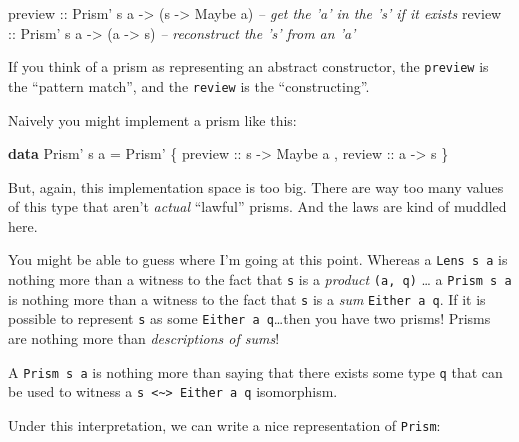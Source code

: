 \documentclass[]{article}
\newenvironment{Shaded}{}{}
\newcommand{\CommentTok}[1]{\textcolor[rgb]{0.38,0.63,0.69}{\textit{#1}}}
\newcommand{\DataTypeTok}[1]{\textcolor[rgb]{0.56,0.13,0.00}{#1}}
\newcommand{\FunctionTok}[1]{\textcolor[rgb]{0.02,0.16,0.49}{#1}}
\newcommand{\KeywordTok}[1]{\textcolor[rgb]{0.00,0.44,0.13}{\textbf{#1}}}
\newcommand{\NormalTok}[1]{#1}
\newcommand{\OtherTok}[1]{\textcolor[rgb]{0.00,0.44,0.13}{#1}}
\begin{document}
\begin{Shaded}
\begin{Highlighting}[]
\OtherTok{preview ::} \DataTypeTok{Prism'}\NormalTok{ s a }\OtherTok{->}\NormalTok{ (s }\OtherTok{->} \DataTypeTok{Maybe}\NormalTok{ a)   }\CommentTok{-- get the 'a' in the 's' if it exists}
\OtherTok{review  ::} \DataTypeTok{Prism'}\NormalTok{ s a }\OtherTok{->}\NormalTok{ (a }\OtherTok{->}\NormalTok{ s)         }\CommentTok{-- reconstruct the 's' from an 'a'}
\end{Highlighting}
\end{Shaded}

If you think of a prism as representing an abstract constructor, the
\texttt{preview} is the ``pattern match'', and the \texttt{review} is the
``constructing''.

Naively you might implement a prism like this:

\begin{Shaded}
\begin{Highlighting}[]
\KeywordTok{data} \DataTypeTok{Prism'}\NormalTok{ s a }\FunctionTok{=} \DataTypeTok{Prism'}
\NormalTok{    \{}\OtherTok{ preview ::}\NormalTok{ s }\OtherTok{->} \DataTypeTok{Maybe}\NormalTok{ a}
\NormalTok{    ,}\OtherTok{ review  ::}\NormalTok{ a }\OtherTok{->}\NormalTok{ s}
\NormalTok{    \}}
\end{Highlighting}
\end{Shaded}

But, again, this implementation space is too big. There are way too many values
of this type that aren't \emph{actual} ``lawful'' prisms. And the laws are kind
of muddled here.

You might be able to guess where I'm going at this point. Whereas a
\texttt{Lens\textquotesingle{}\ s\ a} is nothing more than a witness to the fact
that \texttt{s} is a \emph{product} \texttt{(a,\ q)} \ldots{} a
\texttt{Prism\textquotesingle{}\ s\ a} is nothing more than a witness to the
fact that \texttt{s} is a \emph{sum} \texttt{Either\ a\ q}. If it is possible to
represent \texttt{s} as some \texttt{Either\ a\ q}\ldots{}then you have two
prisms! Prisms are nothing more than \emph{descriptions of sums}!

A \texttt{Prism\textquotesingle{}\ s\ a} is nothing more than saying that there
exists some type \texttt{q} that can be used to witness a
\texttt{s\ \textless{}\textasciitilde{}\textgreater{}\ Either\ a\ q}
isomorphism.

Under this interpretation, we can write a nice representation of
\texttt{Prism\textquotesingle{}}:
\end{document}
